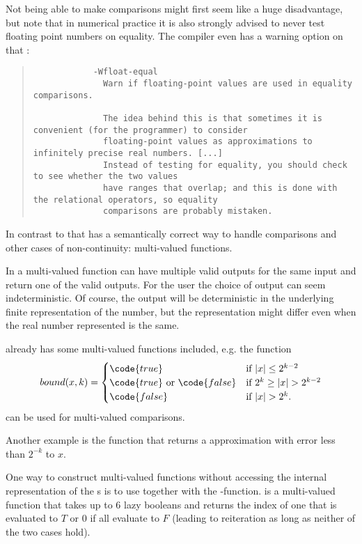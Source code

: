     Not being able to make comparisons might first seem like a huge
    disadvantage, but note that in numerical practice it is also strongly
    advised to never test floating point numbers on equality.  The  compiler even has a warning option on that \cite{GCCMan}:
		\begin{quotation}
				\noindent
		\begin{verbatim}
			-Wfloat-equal
			  Warn if floating-point values are used in equality comparisons.

			  The idea behind this is that sometimes it is convenient (for the programmer) to consider 
			  floating-point values as approximations to infinitely precise real numbers. [...]
			  Instead of testing for equality, you should check to see whether the two values 
			  have ranges that overlap; and this is done with the relational operators, so equality 
			  comparisons are probably mistaken. 
		    \end{verbatim}
		\end{quotation} 

		In contrast to that \irram has a semantically correct way to handle comparisons and other
		cases of non-continuity: multi-valued functions.

		In \irram a multi-valued function can have multiple valid outputs for the same input and 
		return one of the valid outputs.
    For the user the choice of output can seem indeterministic. 
    Of course, the output will be deterministic in the underlying
    finite representation of the number, but the representation might differ even when
    the real number represented is the same.
		
		\irram already has some multi-valued functions included, e.g. the function
		\begin{equation*}
			bound(x,k) = 
			\begin{cases}
				\code{true} & \mbox{if } | x | \leq 2^{k-2} \\
				\code{true} \mbox{ or } \code{false} & \mbox{if } 2^k \geq |x| > 2^{k-2} \\
				 \code{false}  & \mbox{if } |x| > 2^k.
			\end{cases}
		\end{equation*}
		can be used for multi-valued comparisons.

		Another example is the function  that returns a  
		approximation with error less than $2^{-k}$ to $x$.	

		One way to construct multi-valued functions without accessing the internal representation of the {\real}s 
		is to use  together with the -function.
		 is a multi-valued function that takes up to 6 lazy booleans and returns the index of one 
		that is evaluated to $T$ or $0$ if all evaluate to $F$ (leading to reiteration as long as neither of the two cases hold).

